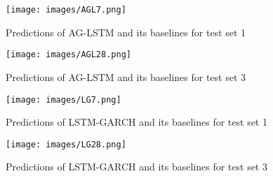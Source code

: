 \begin{figure}
  \vspace{-10pt}
  \begin{center}
\texttt{[image: images/AGL7.png]}
  \end{center}
  \vspace{-10pt}
  \caption{\footnotesize Predictions of AG-LSTM and its baselines for test set 1}
\label{AGL7}
  \vspace{-5pt}
\end{figure}




\begin{figure}
  \vspace{-5pt}
  \begin{center}
\texttt{[image: images/AGL28.png]}
  \end{center}
  \vspace{-10pt}
  \caption{\footnotesize Predictions of AG-LSTM and its baselines for test set 3}
\label{AGL28}
  \vspace{-5pt}
\end{figure}


\begin{figure}
  \vspace{-5pt}
  \begin{center}
\texttt{[image: images/LG7.png]}
  \end{center}
  \vspace{-10pt} 
  \caption{\footnotesize Predictions of LSTM-GARCH and its baselines for test set 1}
\label{LG7}
  \vspace{-10pt}
\end{figure}

\begin{figure}
  \vspace{-10pt}
  \begin{center}
\texttt{[image: images/LG28.png]}
  \end{center}
  \vspace{-10pt}
  \caption{\footnotesize Predictions of LSTM-GARCH and its baselines for test set 3}
\label{LG28}
  \vspace{-20pt}
\end{figure}



